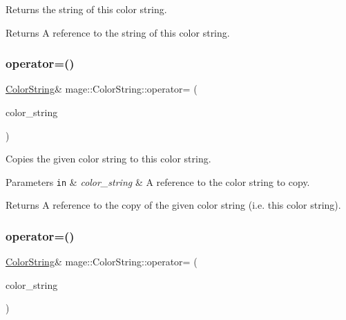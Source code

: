 Returns the string of this color string.

\begin{DoxyReturn}{Returns}
A reference to the string of this color string. 
\end{DoxyReturn}
\hypertarget{structmage_1_1_color_string_a568fed43403422ecafdf92d04e11c4e5}{}\label{structmage_1_1_color_string_a568fed43403422ecafdf92d04e11c4e5} 
\subsubsection{\texorpdfstring{operator=()}{operator=()}\hspace{0.1cm}{\footnotesize\ttfamily [1/2]}}
{\footnotesize\ttfamily \hyperlink{structmage_1_1_color_string}{Color\+String}\& mage\+::\+Color\+String\+::operator= (\begin{DoxyParamCaption}\item[{const \hyperlink{structmage_1_1_color_string}{Color\+String} \&}]{color\+\_\+string }\end{DoxyParamCaption})\hspace{0.3cm}{\ttfamily [default]}}

Copies the given color string to this color string.


\begin{DoxyParams}[1]{Parameters}
\mbox{\tt in}  & {\em color\+\_\+string} & A reference to the color string to copy. \\
\hline
\end{DoxyParams}
\begin{DoxyReturn}{Returns}
A reference to the copy of the given color string (i.\+e. this color string). 
\end{DoxyReturn}
\hypertarget{structmage_1_1_color_string_a2016416ce91bb7e94a8869201db47ef1}{}\label{structmage_1_1_color_string_a2016416ce91bb7e94a8869201db47ef1} 
\subsubsection{\texorpdfstring{operator=()}{operator=()}\hspace{0.1cm}{\footnotesize\ttfamily [2/2]}}
{\footnotesize\ttfamily \hyperlink{structmage_1_1_color_string}{Color\+String}\& mage\+::\+Color\+String\+::operator= (\begin{DoxyParamCaption}\item[{\hyperlink{structmage_1_1_color_string}{Color\+String} \&\&}]{color\+\_\+string }\end{DoxyParamCaption})\hspace{0.3cm}{\ttfamily [default]}}

